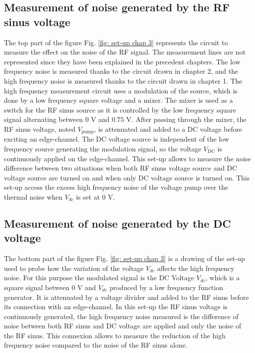 \subsection{Measurement of noise generated by the RF sinus voltage}

The top part of the figure Fig. \ref{fig: set-up chap 3} represents the circuit to measure the effect on the noise of the RF signal.
The measurement lines are not represented since they have been explained in the precedent chapters.
The low frequency noise is measured thanks to the circuit drawn in chapter 2, and the high frequency noise is measured thanks to the circuit drawn in chapter 1.
The high frequency measurement circuit uses a modulation of the source, which is done by a low frequency square voltage and a mixer.
The mixer is used as a switch for the RF sinus source as it is controlled by the low frequency square signal alternating between $0$ V and $0.75$ V.
After passing through the mixer, the RF sinus voltage, noted $V_{\mathrm{pump}}$, is attenuated and added to a DC voltage before exciting an edge-channel.
The DC voltage source is independent of the low frequency source generating the modulation signal, so the voltage $V_{\mathrm{DC}}$ is continuously applied on the edge-channel.
This set-up allows to measure the noise difference between two situations when both RF sinus voltage source and DC voltage source are turned on and when only DC voltage source is turned on.
This set-up access the excess high frequency noise of the voltage pump over the thermal noise when $V_{dc}$ is set at 0 V.

\subsection{Measurement of noise generated by the DC voltage}

The bottom part of the figure Fig. \ref{fig: set-up chap 3} is a drawing of the set-up used to probe how the variation of the voltage $V_{dc}$ affects the high frequency noise.
For this purpose the modulated signal is the DC Voltage $V_{dc}$, which is a square signal between 0 V and $V_{dc}$ produced by a low frequency function generator.
It is attenuated by a voltage divider and added to the RF sinus before its connection with an edge-channel.
In this set-up the RF sinus voltage is continuously generated, the high frequency noise measured is the difference of noise between both RF sinus and DC voltage are applied and only the noise of the RF sinus.
This connexion allows to measure the reduction of the high frequency noise compared to the noise of the RF sinus alone.


